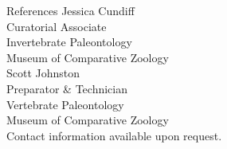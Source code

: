 \documentclass{resume} %
\begin{document}
	\begin{rSection}{References}
		\normalsize Jessica Cundiff \\
		\small Curatorial Associate \\
		Invertebrate Paleontology \\
		Museum of Comparative Zoology \\
		
		\normalsize Scott Johnston \\
		\small Preparator \& Technician \\
		Vertebrate Paleontology \\
		Museum of Comparative Zoology \\
		
		Contact information available upon request.
	\end{rSection}	
\end{document}
